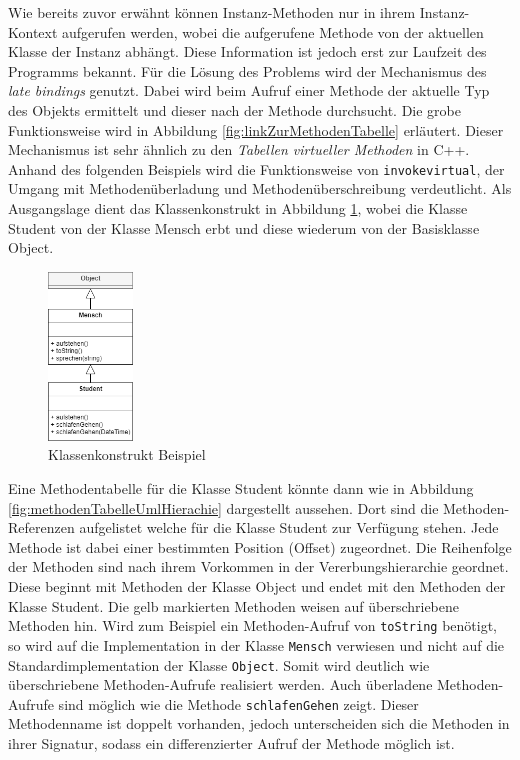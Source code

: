 \documentclass[conference]{IEEEtran}
\begin{document}
Wie bereits zuvor erwähnt können Instanz-Methoden nur in ihrem Instanz-Kontext aufgerufen werden, wobei die aufgerufene Methode von der aktuellen Klasse der Instanz abhängt. Diese Information ist jedoch erst zur Laufzeit des Programms bekannt. Für die Lösung des Problems wird der Mechanismus des \textit{late bindings} genutzt. Dabei wird beim Aufruf einer Methode der aktuelle Typ des Objekts ermittelt und dieser nach der Methode durchsucht. Die grobe Funktionsweise wird in Abbildung \ref{fig:linkZurMethodenTabelle} erläutert. Dieser Mechanismus ist sehr ähnlich zu den \textit{Tabellen virtueller Methoden} in C++. Anhand des folgenden Beispiels wird die Funktionsweise von \verb|invokevirtual|, der Umgang mit Methodenüberladung und Methodenüberschreibung verdeutlicht. Als Ausgangslage dient das Klassenkonstrukt in Abbildung \ref{fig:umlHierarchie}, wobei die Klasse Student von der Klasse Mensch erbt und diese wiederum von der Basisklasse Object.
\begin{figure}[htbp] 
  \centering
     \includegraphics[width=0.2\textwidth]{Grafiken/UMLHierarchie.png}
  \caption{Klassenkonstrukt Beispiel}
  \label{fig:umlHierarchie}
\end{figure}
Eine Methodentabelle für die Klasse Student könnte dann wie in Abbildung \ref{fig:methodenTabelleUmlHierachie} dargestellt aussehen. Dort sind die Methoden-Referenzen aufgelistet  welche für die Klasse Student zur Verfügung stehen. Jede Methode ist dabei einer bestimmten Position (Offset) zugeordnet. Die Reihenfolge der Methoden sind nach ihrem Vorkommen in der Vererbungshierarchie geordnet. Diese beginnt mit Methoden der Klasse Object und endet mit den Methoden der Klasse Student. Die gelb markierten Methoden weisen auf überschriebene Methoden hin. Wird zum Beispiel ein Methoden-Aufruf von \verb|toString| benötigt, so wird auf die Implementation in der Klasse \verb|Mensch| verwiesen und nicht auf die Standardimplementation der Klasse \verb|Object|. Somit wird deutlich wie überschriebene Methoden-Aufrufe realisiert werden. Auch überladene Methoden-Aufrufe sind möglich wie die Methode \verb|schlafenGehen| zeigt. Dieser Methodenname ist doppelt vorhanden, jedoch unterscheiden sich die Methoden in ihrer Signatur, sodass ein differenzierter Aufruf der Methode möglich ist.\cite{Venners.1999}
\end{document}
